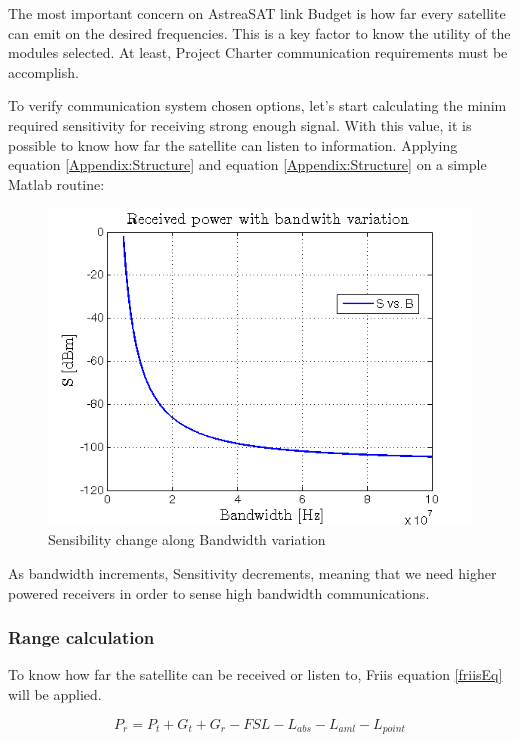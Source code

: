 The most important concern on AstreaSAT link Budget is how far every satellite can emit on the desired frequencies. This is a key factor to know the utility of the modules selected. At least, Project Charter communication requirements must be accomplish.
 
To verify communication system chosen options, let's start calculating the minim required sensitivity for receiving strong enough signal. With this value, it is possible to know how far the satellite can listen to information.
Applying equation \ref{Appendix:Structure} and equation \ref{Appendix:Structure} on a simple Matlab routine:

\begin{figure}[H]
\includegraphics[scale=0.9]{./sections/SatelliteDept/sections/images/SvsB}
\centering
\caption{Sensibility change along Bandwidth variation}
\label{SvsB}
\end{figure}

As bandwidth increments, Sensitivity decrements, meaning that we need higher powered receivers in order to sense high bandwidth communications.

\subsubsection{Range calculation}
To know how far the satellite can be received or listen to, Friis equation \ref{friisEq} will be applied.
 
\begin{equation}
	P_r=P_t+G_t+G_r -FSL -L_{abs}-L_{aml}-L_{point}
	\label{friisEq}
\end{equation}

